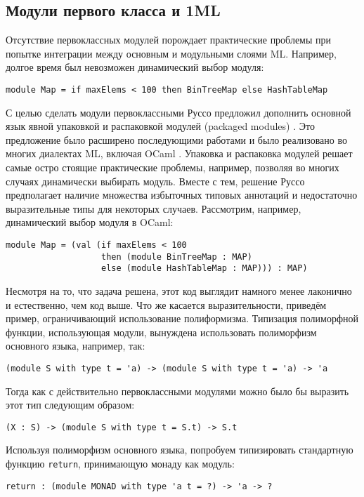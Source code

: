 \documentclass[../diploma.tex]{subfiles}
\begin{document}
 \label{sec:domain_review}

\subsection{Модули первого класса и 1ML}

Отсутствие первоклассных модулей порождает практические проблемы при попытке интеграции между основным и модульными слоями ML. Например, долгое время был невозможен динамический выбор модуля:
\begin{verbatim}
module Map = if maxElems < 100 then BinTreeMap else HashTableMap 
\end{verbatim}

С целью сделать модули первоклассными Руссо предложил дополнить основной язык явной упаковкой и распаковкой модулей (packaged modules) \cite{packaged}. Это предложение было расширено последующими работами и было реализовано во многих диалектах ML, включая OCaml \cite{packaged_ocaml}. Упаковка и распаковка модулей решает самые остро стоящие практические проблемы, например, позволяя во многих случаях динамически выбирать модуль. Вместе с тем, решение Руссо предполагает наличие множества избыточных типовых аннотаций и недостаточно выразительные типы для некоторых случаев. Рассмотрим, например, динамический выбор модуля в OCaml:
\begin{verbatim}
module Map = (val (if maxElems < 100 
                   then (module BinTreeMap : MAP)
                   else (module HashTableMap : MAP))) : MAP)
\end{verbatim}

Несмотря на то, что задача решена, этот код выглядит намного менее лаконично и естественно, чем код выше. Что же касается выразительности, приведём пример, ограничивающий использование полиформизма. Типизация полиморфной функции, использующая модули, вынуждена использовать полиморфизм основного языка, например, так:
\begin{verbatim}
(module S with type t = 'a) -> (module S with type t = 'a) -> 'a
\end{verbatim}

Тогда как с действительно первоклассными модулями можно было бы выразить этот тип следующим образом:
\begin{verbatim}
(X : S) -> (module S with type t = S.t) -> S.t
\end{verbatim}

Используя полиморфизм основного языка, попробуем типизировать стандартную функцию \texttt{return}, принимающую монаду как модуль:
\begin{verbatim}
return : (module MONAD with type 'a t = ?) -> 'a -> ?
\end{verbatim}
\end{document}
